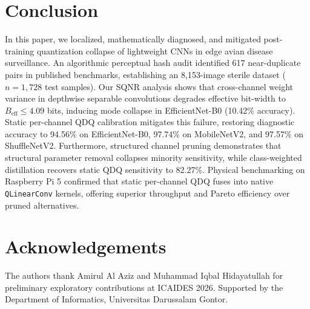 \documentclass{jcse}
\begin{document}
\section{Conclusion}
In this paper, we localized, mathematically diagnosed, and mitigated post-training quantization collapse of lightweight CNNs in edge avian disease surveillance. An algorithmic perceptual hash audit identified 617 near-duplicate pairs in published benchmarks, establishing an 8,153-image sterile dataset ($n=1,728$ test samples). Our SQNR analysis shows that cross-channel weight variance in depthwise separable convolutions degrades effective bit-width to $B_{\text{eff}} \le 4.09$ bits, inducing mode collapse in EfficientNet-B0 (10.42\% accuracy). Static per-channel QDQ calibration mitigates this failure, restoring diagnostic accuracy to 94.56\% on EfficientNet-B0, 97.74\% on MobileNetV2, and 97.57\% on ShuffleNetV2. Furthermore, structured channel pruning demonstrates that structural parameter removal collapses minority sensitivity, while class-weighted distillation recovers static QDQ sensitivity to 82.27\%. Physical benchmarking on Raspberry Pi 5 confirmed that static per-channel QDQ fuses into native \texttt{QLinearConv} kernels, offering superior throughput and Pareto efficiency over pruned alternatives.

\section*{Acknowledgements}
The authors thank Amirul Al Aziz and Muhammad Iqbal Hidayatullah for preliminary exploratory contributions at ICAIDES 2026. Supported by the Department of Informatics, Universitas Darussalam Gontor.
\end{document}
